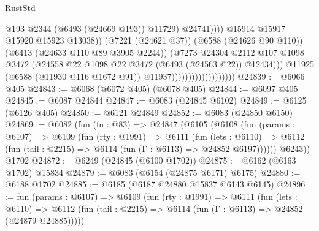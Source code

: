 \begin{lexlean}{RustStd}
\begin{coremodule}
                                                          @193
                                                          @2344
                                                          (@6493 (@24669 @193))
                                                          @11729)
                                                        @24741))))
                                                @15914
                                                @15917
                                                @15920
                                                @15923
                                                @13038))
                                            (@7221 (@24621 @37))
                                            (@6588 (@24626 @90 @110))
                                            (@6413 (@24633 @110 @89 @3905 @2244))
                                            (@7273
                                              @24304
                                              @2112
                                              @107
                                              @1098
                                              @3472
                                              (@24558
                                                @22
                                                @1098
                                                @22
                                                @3472
                                                (@6493 (@24563 @22))
                                                @12434)))
                                          @11925
                                          (@6588 (@11930 @116 @1672 @91))
                                          @11937)))))))))))))))))))
@24839 := @6066 @405
@24843 := @6068 (@6072 @405) (@6078 @405)
@24844 := @6097 @405
@24845 := @6087 @24844
@24847 := @6083 (@24845 @6102)
@24849 := @6125 (@6126 @405)
@24850 := @6121 @24849
@24852 := @6083 (@24850 @6150)
@24869 := @6082
    (fun (fn : @83) =>
    @24847
      (@6105
        (@6108
          (fun (params : @6107) =>
          @6109
            (fun (rty : @1991) =>
            @6111
              (fun (lets : @6110) =>
              @6112 (fun (tail : @2215) => @6114 (fun (Γ : @6113) => @24852 @6197))))))
        @6243))
    @1702
@24872 := @6249 (@24845 (@6100 @1702))
@24875 := @6162 (@6163 @1702) @15834
@24879 := @6083 (@6154 (@24875 @6171) @6175)
@24880 := @6188 @1702
@24885 := @6185 (@6187 @24880 @15837 @6143 @6145)
@24896 := fun (params : @6107) =>
  @6109
    (fun (rty : @1991) =>
    @6111
      (fun (lets : @6110) =>
      @6112 (fun (tail : @2215) => @6114 (fun (Γ : @6113) => @24852 (@24879 @24885)))))

\end{coremodule}
\end{lexlean}
